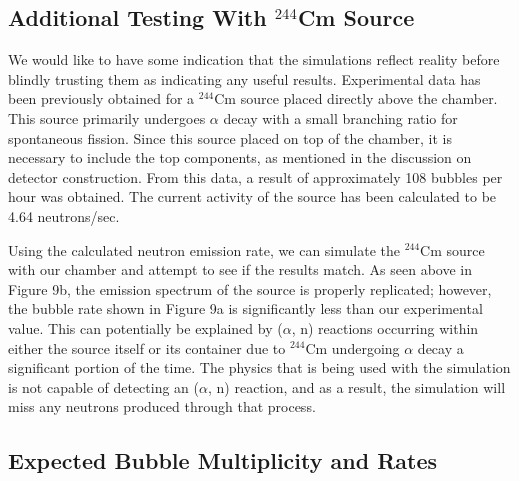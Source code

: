 \documentclass[%
12pt,
twoside,
reprint,
amsmath,amssymb,
aps,
]{article}
\begin{document}
	\subsection{Additional Testing With $^{244}$Cm Source}
	\par We would like to have some indication that the simulations reflect reality before blindly trusting them as indicating any useful results. Experimental data has been previously obtained for a $^{244}$Cm source placed directly above the chamber. This source primarily undergoes $\alpha$ decay with a small branching ratio for spontaneous fission. Since this source placed on top of the chamber, it is necessary to include the top components, as mentioned in the discussion on detector construction. From this data, a result of approximately 108 bubbles per hour was obtained. The current activity of the source has been calculated to be 4.64 neutrons/sec.
	\par Using the calculated neutron emission rate, we can simulate the $^{244}$Cm source with our chamber and attempt to see if the results match. As seen above in Figure 9b, the emission spectrum of the source is properly replicated; however, the bubble rate shown in Figure 9a is significantly less than our experimental value. This can potentially be explained by ($\alpha$, n) reactions occurring within either the source itself or its container due to $^{244}$Cm undergoing $\alpha$ decay a significant portion of the time. The physics that is being used with the simulation is not capable of detecting an ($\alpha$, n) reaction, and as a result, the simulation will miss any neutrons produced through that process.
	
	\subsection{Expected Bubble Multiplicity and Rates}
\end{document}

